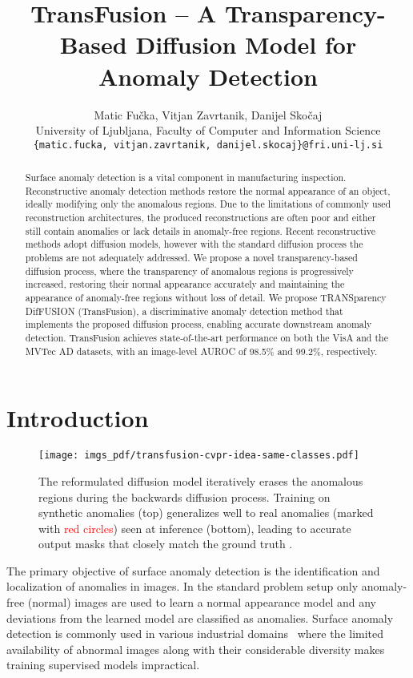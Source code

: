 \documentclass[10pt,twocolumn,letterpaper]{article}
\title{TransFusion -- A Transparency-Based Diffusion Model for Anomaly Detection}
\author{Matic Fučka, Vitjan Zavrtanik, Danijel Skočaj\\
University of Ljubljana, Faculty of Computer and Information Science\\
{\tt\small \{matic.fucka, vitjan.zavrtanik, danijel.skocaj\}@fri.uni-lj.si}
}
\begin{document}
\maketitle
\begin{abstract}
Surface anomaly detection is a vital component in manufacturing inspection. Reconstructive anomaly detection methods restore the normal appearance of an object, ideally modifying only the anomalous regions. Due to the limitations of commonly used reconstruction architectures, the produced reconstructions are often poor and either still contain anomalies or lack details in anomaly-free regions. Recent reconstructive methods adopt diffusion models, however with the standard diffusion process the problems are not adequately addressed. We propose a novel transparency-based diffusion process, where the transparency of anomalous regions is progressively increased, restoring their normal appearance accurately and maintaining the appearance of anomaly-free regions without loss of detail. We propose TRANSparency DifFUSION (TransFusion), a discriminative anomaly detection method that implements the proposed diffusion process, enabling accurate downstream anomaly detection. TransFusion achieves state-of-the-art performance on both the VisA and the MVTec AD datasets, with an image-level AUROC of 98.5\% and 99.2\%, respectively. 
\end{abstract}


 \section{Introduction}
\label{sec:intro}


\begin{figure}[t]
\centering
\texttt{[image: imgs\_pdf/transfusion-cvpr-idea-same-classes.pdf]}
\caption{The reformulated diffusion model iteratively erases the anomalous regions during the backwards diffusion process. Training on synthetic anomalies (top) generalizes well to real anomalies (marked with \textcolor{red}{red circles}) seen at inference (bottom), leading to accurate output masks  that closely match the ground truth .
}
\label{fig:transfusion-idea}
\end{figure}

The primary objective of surface anomaly detection is the identification and localization of anomalies in images. In the standard problem setup only anomaly-free (normal) images are used to learn a normal appearance model and any deviations from the learned model are classified as anomalies. Surface anomaly detection is commonly used in various industrial domains~\cite{mvtec, visa, mvtec-loco} where the limited availability of abnormal images along with their considerable diversity makes training supervised models impractical.
\end{document}
